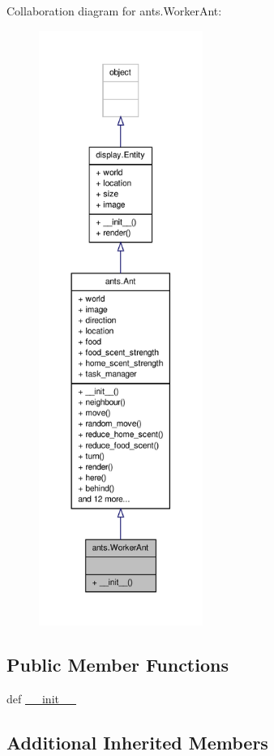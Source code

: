 Collaboration diagram for ants.\+Worker\+Ant\+:
\nopagebreak
\begin{figure}[H]
\begin{center}
\leavevmode
\includegraphics[height=550pt]{classants_1_1WorkerAnt__coll__graph}
\end{center}
\end{figure}
\subsection*{Public Member Functions}
\begin{DoxyCompactItemize}
\item 
def \hyperlink{classants_1_1WorkerAnt_a82e7d37f66c81e029cad6038d6515056}{\+\_\+\+\_\+init\+\_\+\+\_\+}
\end{DoxyCompactItemize}
\subsection*{Additional Inherited Members}



